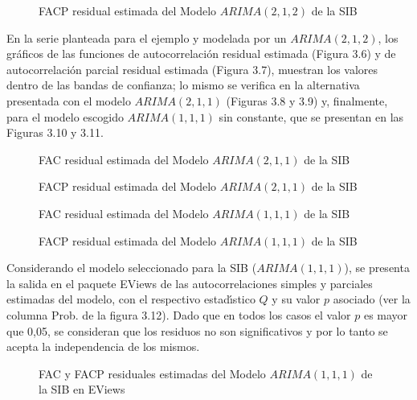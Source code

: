 \begin{figure}[H]
\centering
\caption{FACP residual estimada del Modelo $ARIMA(2,1,2)$ de la SIB}
\end{figure}


\begin{ejemplo}
En la serie planteada para el ejemplo y modelada por un $ARIMA(2,1,2)$, los gr\'{a}ficos de las funciones de autocorrelaci\'{o}n residual estimada (Figura 3.6) y de autocorrelaci\'{o}n parcial residual estimada (Figura 3.7), muestran los valores dentro de las bandas de confianza; lo mismo se verifica en la alternativa presentada con el modelo $ARIMA(2,1,1)$ (Figuras 3.8 y 3.9) y, finalmente, para el modelo escogido 
$ARIMA(1,1,1)$ sin constante, que se presentan en las Figuras 3.10 y 3.11.

\begin{figure}[H]
\centering
\caption{FAC residual estimada del Modelo $ARIMA(2,1,1)$ de la SIB}
\end{figure}


\begin{figure}[H]
\centering
\caption{FACP residual estimada del Modelo $ARIMA(2,1,1)$ de la SIB}
\end{figure}


\begin{figure}[H]
\centering
\caption{FAC residual estimada del Modelo $ARIMA(1,1,1)$ de la SIB}
\end{figure}


\begin{figure}[H]
\centering
\caption{FACP residual estimada del Modelo $ARIMA(1,1,1)$ de la SIB}
\end{figure}


Considerando el modelo seleccionado para la SIB ($ARIMA(1,1,1)$), se presenta 
la salida en el paquete EViews de las autocorrelaciones simples y parciales 
estimadas del modelo, con el respectivo estad\'{\i}stico $Q$ y su valor $p$ 
asociado (ver la columna Prob. de la figura 3.12). Dado que en todos los 
casos el valor $p$ es mayor que 0,05, se consideran que los residuos no son 
significativos y por lo tanto se acepta la independencia de los mismos.

\begin{figure}[H]
\centering
\caption{FAC y FACP residuales estimadas del Modelo $ARIMA(1,1,1)$ de la 
SIB en EViews}
\end{figure}
\end{ejemplo}



